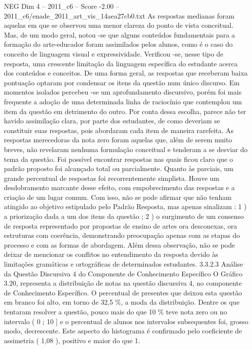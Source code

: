 \begin{textsample}{NEG Dim 4 – 2011\_c6 – Score -2.00 – 2011\_c6/enade\_2011\_art\_vis\_14aea27cb0.txt}
As respostas medianas foram aquelas em que se observou uma menor clareza do ponto de vista conceitual.
Mas, de um modo geral, notou -se que alguns conteúdos fundamentais para a formação do arte-educador foram assimilados pelos alunos, como é o caso do conceito de linguagem visual e expressividade.
Verificou -se, nesse tipo de resposta, uma crescente limitação da linguagem específica do estudante acerca dos conteúdos e conceitos.
De uma forma geral, as respostas que receberam baixa pontuação optaram por condensar os itens da questão num único discurso.
Em momentos isolados percebeu -se um aprofundamento discursivo, porém foi mais frequente a adoção de uma determinada linha de raciocínio que contemplou um item da questão em detrimento do outro.
Por conta dessa escolha, parece não ter havido assimilação clara, por parte dos estudantes, de como deveriam se constituir suas respostas, pois abordaram cada item de maneira rarefeita.
As respostas merecedoras da nota zero foram aquelas que, além de serem muito breves, não revelaram nenhuma formulação conceitual e tenderam a se desviar do tema da questão.
Foi possível encontrar respostas nas quais ficou claro que o padrão proposto foi alcançado total ou parcialmente.
Quanto às parciais, um grande percentual de respostas foi recorrentemente simplista.
Houve um desdobramento marcante desse efeito, com empobrecimento das respostas e a criação de um lugar comum.
Com isso, não se pode afirmar que não tenham atingido ao objetivo estipulado pelo Padrão Resposta, mas apenas sinalizam : 1 ) a priorização dada a um dos itens da questão ; 2 ) o surgimento de um consenso de resposta representado por propostas de ensino de artes ora desconexas, ora estruturas com coerência, demonstrando preocupação apenas com as etapas do processo e com as formas de abordagem.
Além dessa observação, não se pode deixar de mencionar os conflitos no entendimento da resposta devido às limitações gramáticas e ortográficas de determinados estudantes. 3.3.2.3 Análise da Questão Discursiva 4 do Componente de Conhecimento Específico O Gráfico 3.20, representa a distribuição de notas na questão discursiva 4, no componente de Conhecimento Específico.
O percentual de presentes que deixou esta questão em branco foi alto, em torno de 32,5 \%, a moda da distribuição.
Dentre os que tentaram resolver a questão, pouco mais do que 10 \% teve nota zero ou no intervalo ( 0 ; 10 ] e o percentual de alunos nos intervalos subsequentes foi, grosso modo, decrescente.
Este aspecto do histograma é confirmado pelo coeficiente de assimetria ( 1,08 ), positivo e maior do que 1.

\end{textsample}
